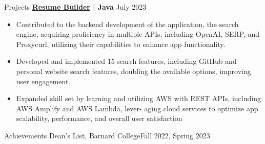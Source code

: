\documentclass{resume} %
\begin{document}
\vspace{-0.4em}

\begin{rSection}{Projects}
{\textbf{\href{www.github.com}{\underline{Resume Builder}} $\vert$ Java}} \hfill July 2023 \\ 
\vspace{-1.5em}
\begin{itemize}
\item Contributed to the backend development of the application, the search engine, acquiring proficiency in multiple APIs, including OpenAI, SERP, and Proxycurl, utilizing their capabilities to enhance app functionality.
\vspace{-0.4em}
\item Developed and implemented 15 search features, including GitHub and personal website search features, doubling the available options, improving user engagement.
\vspace{-0.4em}
\item Expanded skill set by learning and utilizing AWS with REST APIs, including AWS Amplify and AWS Lambda, lever- aging cloud services to optimize app scalability, performance, and overall user satisfaction
\vspace{-0.4em}
\end{itemize}
\end{rSection}

\vspace{-0.2em}

\begin{rSection}{Achievements}
{Dean's List, Barnard College}\hfill Fall 2022, Spring 2023\\ 
\end{rSection}

\end{document}
